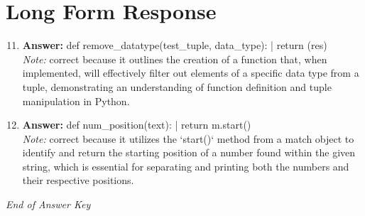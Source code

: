 \documentclass[12pt]{article}
\begin{document}
\section*{Long Form Response}
\begin{enumerate}[label=\arabic*.]
\setcounter{enumi}{10}
\item \textbf{Answer:} def remove\_datatype(test\_tuple, data\_type): | return (res)
\\ \textit{Note:} correct because it outlines the creation of a function that, when implemented, will effectively filter out elements of a specific data type from a tuple, demonstrating an understanding of function definition and tuple manipulation in Python.
\item \textbf{Answer:} def num\_position(text): | return m.start()
\\ \textit{Note:} correct because it utilizes the `start()` method from a match object to identify and return the starting position of a number found within the given string, which is essential for separating and printing both the numbers and their respective positions.
\end{enumerate}

\vfill
\noindent\textit{End of Answer Key}
\end{document}
